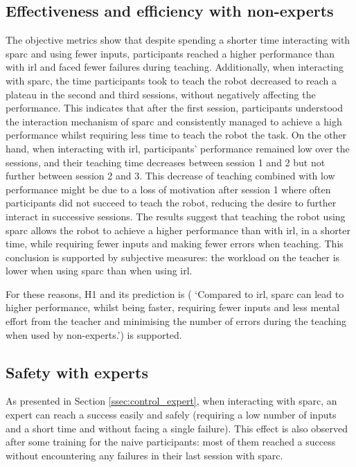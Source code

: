 \subsection{Effectiveness and efficiency with non-experts}
The objective metrics show that despite spending a shorter time interacting with \gls{sparc} and using fewer inputs, participants reached a higher performance than with \gls{irl} and faced fewer failures during teaching. Additionally, when interacting with \gls{sparc}, the time participants took to teach the robot decreased to reach a plateau in the second and third sessions, without negatively affecting the performance. This indicates that after the first session, participants understood the interaction mechanism of \gls{sparc} and consistently managed to achieve a high performance whilst requiring less time to teach the robot the task. On the other hand, when interacting with \gls{irl}, participants' performance remained low over the sessions, and their teaching time decreases between session 1 and 2 but not further between session 2 and 3. This decrease of teaching combined with low performance might be due to a loss of motivation after session 1 where often participants did not succeed to teach the robot, reducing the desire to further interact in successive sessions. The results suggest that teaching the robot using \gls{sparc} allows the robot to achieve a higher performance than with \gls{irl}, in a shorter time, while requiring fewer inputs and making fewer errors when teaching. This conclusion is supported by subjective measures: the workload on the teacher is lower when using \gls{sparc} than when using \gls{irl}. 

For these reasons, H1 and its prediction is ( `Compared to \gls{irl}, \gls{sparc} can lead to higher performance, whilst being faster, requiring fewer inputs and less mental effort from the teacher and minimising the number of errors during the teaching when used by non-experts.') is supported.

\subsection{Safety with experts}

As presented in Section \ref{ssec:control_expert}, when interacting with \gls{sparc}, an expert can reach a success easily and safely (requiring a low number of inputs and a short time and without facing a single failure). This effect is also observed after some training for the naive participants: most of them reached a success without encountering any failures in their last session with \gls{sparc}.

